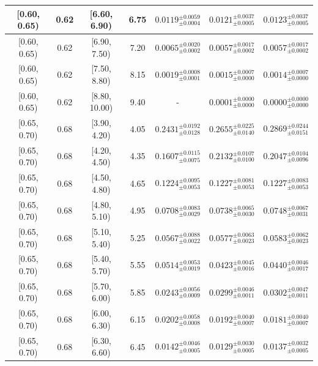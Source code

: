 \begin{longtable}{|c|c|c|c|c|c|c|}
\hline
[0.60, 0.65) & 0.62 & [6.60, 6.90) & 6.75 & $0.0119^{ \pm 0.0059 }_{ \pm 0.0004 }$ & $0.0121^{ \pm 0.0037 }_{ \pm 0.0005 }$ & $0.0123^{ \pm 0.0037 }_{ \pm 0.0005 }$ \\ 
\hline
[0.60, 0.65) & 0.62 & [6.90, 7.50) & 7.20 & $0.0065^{ \pm 0.0020 }_{ \pm 0.0002 }$ & $0.0057^{ \pm 0.0017 }_{ \pm 0.0002 }$ & $0.0057^{ \pm 0.0017 }_{ \pm 0.0002 }$ \\ 
\hline
[0.60, 0.65) & 0.62 & [7.50, 8.80) & 8.15 & $0.0019^{ \pm 0.0008 }_{ \pm 0.0001 }$ & $0.0015^{ \pm 0.0007 }_{ \pm 0.0000 }$ & $0.0014^{ \pm 0.0007 }_{ \pm 0.0000 }$ \\ 
\hline
[0.60, 0.65) & 0.62 & [8.80, 10.00) & 9.40 & - & $0.0001^{ \pm 0.0000 }_{ \pm 0.0000 }$ & $0.0000^{ \pm 0.0000 }_{ \pm 0.0000 }$ \\ 
\hline
[0.65, 0.70) & 0.68 & [3.90, 4.20) & 4.05 & $0.2431^{ \pm 0.0192 }_{ \pm 0.0128 }$ & $0.2655^{ \pm 0.0225 }_{ \pm 0.0140 }$ & $0.2869^{ \pm 0.0244 }_{ \pm 0.0151 }$ \\ 
\hline
[0.65, 0.70) & 0.68 & [4.20, 4.50) & 4.35 & $0.1607^{ \pm 0.0115 }_{ \pm 0.0075 }$ & $0.2132^{ \pm 0.0107 }_{ \pm 0.0100 }$ & $0.2047^{ \pm 0.0104 }_{ \pm 0.0096 }$ \\ 
\hline
[0.65, 0.70) & 0.68 & [4.50, 4.80) & 4.65 & $0.1224^{ \pm 0.0095 }_{ \pm 0.0053 }$ & $0.1227^{ \pm 0.0081 }_{ \pm 0.0053 }$ & $0.1227^{ \pm 0.0083 }_{ \pm 0.0053 }$ \\ 
\hline
[0.65, 0.70) & 0.68 & [4.80, 5.10) & 4.95 & $0.0708^{ \pm 0.0083 }_{ \pm 0.0029 }$ & $0.0738^{ \pm 0.0065 }_{ \pm 0.0030 }$ & $0.0748^{ \pm 0.0067 }_{ \pm 0.0031 }$ \\ 
\hline
[0.65, 0.70) & 0.68 & [5.10, 5.40) & 5.25 & $0.0567^{ \pm 0.0088 }_{ \pm 0.0022 }$ & $0.0577^{ \pm 0.0063 }_{ \pm 0.0023 }$ & $0.0583^{ \pm 0.0062 }_{ \pm 0.0023 }$ \\ 
\hline
[0.65, 0.70) & 0.68 & [5.40, 5.70) & 5.55 & $0.0514^{ \pm 0.0053 }_{ \pm 0.0019 }$ & $0.0423^{ \pm 0.0045 }_{ \pm 0.0016 }$ & $0.0440^{ \pm 0.0046 }_{ \pm 0.0017 }$ \\ 
\hline
[0.65, 0.70) & 0.68 & [5.70, 6.00) & 5.85 & $0.0243^{ \pm 0.0056 }_{ \pm 0.0009 }$ & $0.0299^{ \pm 0.0046 }_{ \pm 0.0011 }$ & $0.0302^{ \pm 0.0047 }_{ \pm 0.0011 }$ \\ 
\hline
[0.65, 0.70) & 0.68 & [6.00, 6.30) & 6.15 & $0.0202^{ \pm 0.0058 }_{ \pm 0.0008 }$ & $0.0192^{ \pm 0.0040 }_{ \pm 0.0007 }$ & $0.0181^{ \pm 0.0040 }_{ \pm 0.0007 }$ \\ 
\hline
[0.65, 0.70) & 0.68 & [6.30, 6.60) & 6.45 & $0.0142^{ \pm 0.0046 }_{ \pm 0.0005 }$ & $0.0129^{ \pm 0.0030 }_{ \pm 0.0005 }$ & $0.0137^{ \pm 0.0032 }_{ \pm 0.0005 }$ \\ 

\end{longtable}
